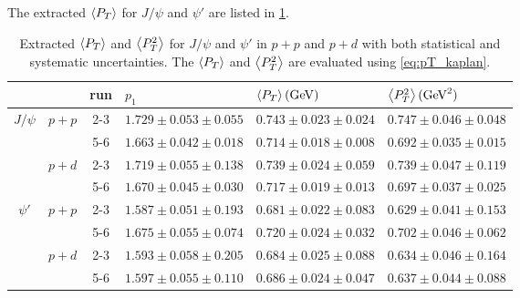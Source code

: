 \documentclass[reprint,aps,unsortedaddress,superscriptaddress,prd,floatfix,showpacs,linenumbers]{revtex4-2}
\begin{document}
The extracted $\expval{P_T}$ for $J/\psi$ and $\psi'$ are listed in \cref{tab:kaplan_result}.
\begin{table}[h!]
	\centering
	\caption{Extracted $\expval{P_T}$ and $\expval{P^2_T}$ for $J/\psi$ and $\psi'$ in $p+p$ and $p+d$
		with both statistical and systematic uncertainties.	The $\expval{P_T}$ and $\expval{P^2_T}$ are evaluated
		using \cref{eq:pT_kaplan}.}
	\label{tab:kaplan_result}
	\begin{tabular}{cc|c|>{\centering}m{4cm}|>{\centering}m{4cm}|m{4cm}<{\centering}}
		\hline
		                                               &                        & run & $p_1$                   & $\expval{P_T} (\unit{\GeV})$ & $\expval{P^2_T} (\unit{\square\GeV})$ \\ \hline
		\multicolumn{1}{c|}{\multirow{4}{*}{$J/\psi$}} & \multirow{2}{*}{$p+p$} & 2-3 & $1.729\pm0.053\pm0.055$ & $0.743\pm0.023\pm0.024$      & $0.747\pm0.046\pm0.048$               \\ \cline{3-6}
		\multicolumn{1}{c|}{}                          &                        & 5-6 & $1.663\pm0.042\pm0.018$ & $0.714\pm0.018\pm0.008$      & $0.692\pm0.035\pm0.015$               \\ \cline{2-6}
		\multicolumn{1}{c|}{}                          & \multirow{2}{*}{$p+d$} & 2-3 & $1.719\pm0.055\pm0.138$ & $0.739\pm0.024\pm0.059$      & $0.739\pm0.047\pm0.119$               \\ \cline{3-6}
		\multicolumn{1}{c|}{}                          &                        & 5-6 & $1.670\pm0.045\pm0.030$ & $0.717\pm0.019\pm0.013$      & $0.697\pm0.037\pm0.025$               \\ \hline
		\multicolumn{1}{c|}{\multirow{4}{*}{$\psi'$}}  & \multirow{2}{*}{$p+p$} & 2-3 & $1.587\pm0.051\pm0.193$ & $0.681\pm0.022\pm0.083$      & $0.629\pm0.041\pm0.153$               \\ \cline{3-6}
		\multicolumn{1}{c|}{}                          &                        & 5-6 & $1.675\pm0.055\pm0.074$ & $0.720\pm0.024\pm0.032$      & $0.702\pm0.046\pm0.062$               \\ \cline{2-6}
		\multicolumn{1}{c|}{}                          & \multirow{2}{*}{$p+d$} & 2-3 & $1.593\pm0.058\pm0.205$ & $0.684\pm0.025\pm0.088$      & $0.634\pm0.046\pm0.164$               \\ \cline{3-6}
		\multicolumn{1}{c|}{}                          &                        & 5-6 & $1.597\pm0.055\pm0.110$ & $0.686\pm0.024\pm0.047$      & $0.637\pm0.044\pm0.088$               \\ \hline
	\end{tabular}
\end{table}
\end{document}
